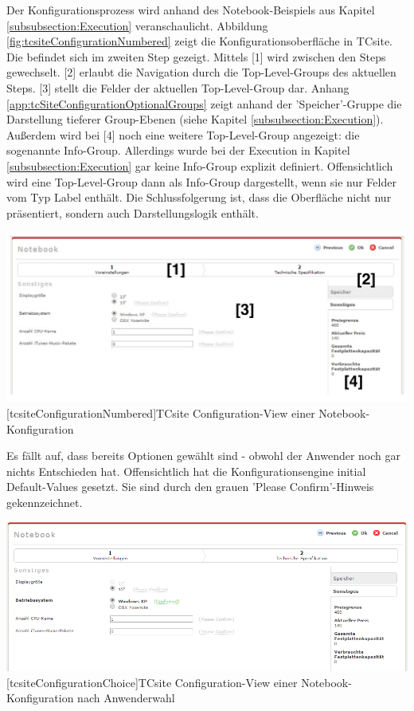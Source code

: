 \documentclass[12pt,a4paper,bibliography=totocnumbered,listof=totoc]{scrartcl}
\begin{document}
Der Konfigurationsprozess wird anhand des Notebook-Beispiels aus Kapitel \ref{subsubsection:Execution} veranschaulicht. Abbildung \ref{fig:tcsiteConfigurationNumbered} zeigt die Konfigurationsoberfläche in TCsite. Die befindet sich im zweiten Step gezeigt. Mittels [1] wird zwischen den Steps gewechselt. [2] erlaubt die Navigation durch die Top-Level-Groups des aktuellen Steps. [3] stellt die Felder der aktuellen Top-Level-Group dar. Anhang \ref{app:tcSiteConfigurationOptionalGroups} zeigt anhand der 'Speicher'-Gruppe die Darstellung tieferer Group-Ebenen (siehe Kapitel \ref{subsubsection:Execution}). Außerdem wird bei [4] noch eine weitere Top-Level-Group angezeigt: die sogenannte Info-Group. Allerdings wurde bei der Execution in Kapitel \ref{subsubsection:Execution} gar keine Info-Group explizit definiert. Offensichtlich wird eine Top-Level-Group dann als Info-Group dargestellt, wenn sie nur Felder vom Typ Label enthält. Die Schlussfolgerung ist, dass die Oberfläche nicht nur präsentiert, sondern auch Darstellungslogik enthält.

\vspace{1em}
\begin{minipage}{\linewidth}
	\centering
	\includegraphics[width=0.8\linewidth]{Abbildungen/tcsiteConfigurationNumbered.pdf}
	[tcsiteConfigurationNumbered]{TCsite Configuration-View einer Notebook-Konfiguration}
	\label{fig:tcsiteConfigurationNumbered}
\end{minipage}
\vspace{1em}

Es fällt auf, dass bereits Optionen gewählt sind - obwohl der Anwender noch gar nichts Entschieden hat. Offensichtlich hat die Konfigurationsengine initial Default-Values gesetzt. Sie sind durch den grauen 'Please Confirm'-Hinweis gekennzeichnet.

\vspace{1em}
\begin{minipage}{\linewidth}
	\centering
	\includegraphics[width=0.8\linewidth]{Abbildungen/tcsiteConfigurationChoice.PNG}
	[tcsiteConfigurationChoice]{TCsite Configuration-View einer Notebook-Konfiguration nach Anwenderwahl}
	\label{fig:tcsiteConfigurationChoice}
\end{minipage}
\vspace{1em}
\end{document}
